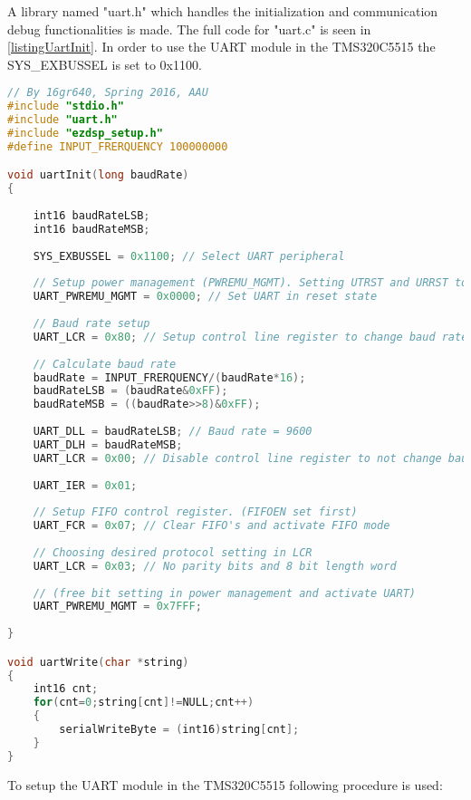 A library named "uart.h" which handles the initialization and communication debug functionalities is made. The full code for "uart.c" is seen in \autoref{listingUartInit}. In order to use the UART module in the TMS320C5515 the SYS\_EXBUSSEL is set to 0x1100. 

\begin{lstlisting}[language=C, caption = {Initialization of UART},label={listingUartInit}]
// By 16gr640, Spring 2016, AAU
#include "stdio.h"
#include "uart.h"
#include "ezdsp_setup.h"
#define INPUT_FRERQUENCY 100000000

void uartInit(long baudRate)
{
	
	int16 baudRateLSB;
	int16 baudRateMSB;
	
	SYS_EXBUSSEL = 0x1100; // Select UART peripheral
	
	// Setup power management (PWREMU_MGMT). Setting UTRST and URRST to 0
	UART_PWREMU_MGMT = 0x0000; // Set UART in reset state
	
	// Baud rate setup 
	UART_LCR = 0x80; // Setup control line register to change baud rate
	
	// Calculate baud rate
	baudRate = INPUT_FRERQUENCY/(baudRate*16);
	baudRateLSB = (baudRate&0xFF);
	baudRateMSB = ((baudRate>>8)&0xFF);
	
	UART_DLL = baudRateLSB; // Baud rate = 9600
	UART_DLH = baudRateMSB;
	UART_LCR = 0x00; // Disable control line register to not change baud rate
	
	UART_IER = 0x01;
	
	// Setup FIFO control register. (FIFOEN set first) 
	UART_FCR = 0x07; // Clear FIFO's and activate FIFO mode
	
	// Choosing desired protocol setting in LCR
	UART_LCR = 0x03; // No parity bits and 8 bit length word
	
	// (free bit setting in power management and activate UART)
	UART_PWREMU_MGMT = 0x7FFF; 
	
}

void uartWrite(char *string)
{
	int16 cnt;
	for(cnt=0;string[cnt]!=NULL;cnt++)
	{
		serialWriteByte = (int16)string[cnt];
	}
}
\end{lstlisting}

To setup the UART module in the TMS320C5515 following procedure is used:


